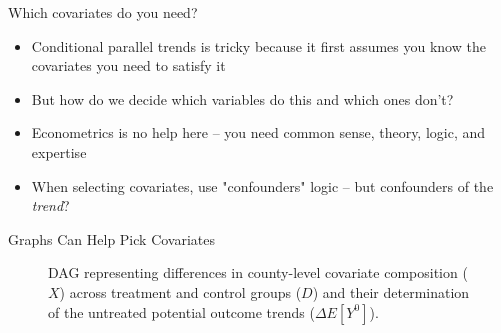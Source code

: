 \documentclass{beamer}
\begin{document}
\begin{frame}{Which covariates do you need?}

\begin{itemize}
\item Conditional parallel trends is tricky because it first assumes you know the covariates you need to satisfy it
\item But how do we decide which variables do this and which ones don't?
\item Econometrics is no help here -- you need common sense, theory, logic, and expertise
\item When selecting covariates, use "confounders" logic -- but confounders of the \emph{trend}?
\end{itemize}

\end{frame}
	



\begin{frame}{Graphs Can Help Pick Covariates}

\begin{figure}[h!]
    \centering
\caption{DAG representing differences in county-level covariate composition (\(X\)) across treatment and control groups (\(D\)) and their determination of the untreated potential outcome trends (\(\Delta E\left[Y^0\right]\)).}
\end{figure}

\end{frame}
\end{document}
